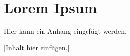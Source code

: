
\section*{Lorem Ipsum}
\label{appendix:A}

Hier kann ein Anhang eingefügt werden.

[Inhalt hier einfügen.]